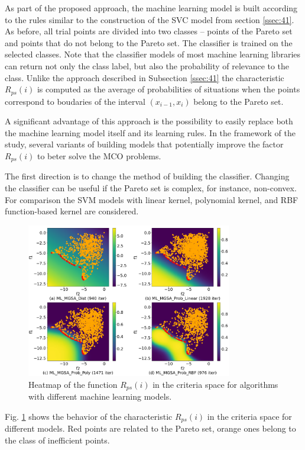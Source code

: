 \documentclass[runningheads]{llncs}
\begin{document}
As part of the proposed approach, the machine learning model is built according to the rules similar to the construction of the SVC model from section \ref{ssec:41}. As before, all trial points are divided into two classes -- points of the Pareto set and points that do not belong to the Pareto set. The classifier is trained on the selected classes. Note that the classifier models of most machine learning libraries can return not only the class label, but also the probability of relevance to the class. Unlike the approach described in Subsection \ref{ssec:41} the characteristic $R_{ps}(i)$ is computed as the average of probabilities of situations when the points
correspond to boudaries of the interval $(x_{i-1},x_{i})$ belong to the Pareto set.

A significant advantage of this approach is the possibility to easily replace both the machine learning model itself and its learning rules. In the framework of the study, several variants of building models that potentially improve the factor $R_{ps}(i)$ to beter solve the MCO problems.

The first direction is to change the method of building the classifier. Changing the classifier can be useful if the Pareto set is complex, for instance, non-convex.
For comparison the SVM models with linear kernel, polynomial kernel, and RBF function-based kernel are considered.

\begin{figure}
\centering
\includegraphics[width=0.8\textwidth]{fig1.png}
\caption{Heatmap of the function $R_{ps}(i)$ in the criteria space for algorithms with different machine learning models.} 
\label{fig:1}
\end{figure}

Fig. \ref{fig:1} shows the behavior of the characteristic $R_{ps}(i)$ in the criteria space for different models. Red points are related to the Pareto set, orange ones belong to the class of inefficient points. 
\end{document}
